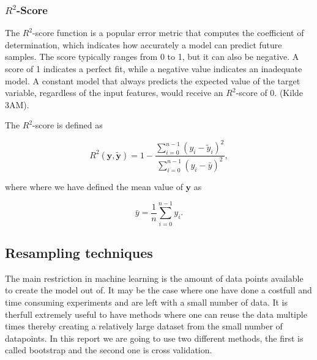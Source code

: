 \subsubsection{$R^2$-Score}

\noindent The $R^2$-score function is a popular error metric that computes the coefficient of determination, which indicates how
accurately a model can predict future samples. The score typically ranges from 0 to 1, but it can also be negative. A score of 1 indicates
a perfect fit, while a negative value indicates an inadequate model. A constant model that always predicts the expected value of the target
variable, regardless of the input features, would receive an $R^2$-score of 0. (Kilde 3AM).

\noindent The $R^2$-score is defined as 

\begin{equation} 
R^2(\boldsymbol{y}, \tilde{\boldsymbol{y}}) = 1 - \frac{\sum_{i=0}^{n - 1} (y_i - \tilde{y}_i)^2}{\sum_{i=0}^{n - 1} (y_i - \bar{y})^2}, \label{R2} 
\end{equation}

\noindent where where we have defined the mean value of $\boldsymbol{y}$ as

\begin{equation} 
\bar{y} =  \frac{1}{n} \sum_{i=0}^{n - 1} y_i.
\end{equation}



\subsection{Resampling techniques}

\noindent The main restriction in machine learning is 
the amount of data points available to create the model out of. It may be the case where one have
done a costfull and time consuming experiments and are left with a small number of data. 
It is therfull extremely useful to have methods where one can reuse the data multiple times
thereby creating a relatively large dataset from the small number of datapoints. In this report
we are going to use two different methods, the first is called bootstrap and the second one is cross validation.

